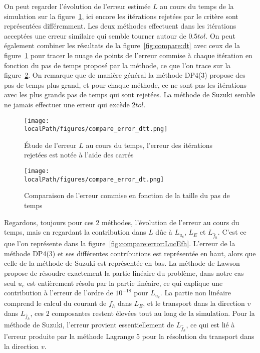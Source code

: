 On peut regarder l'évolution de l'erreur estimée $L$ au cours du temps de la simulation sur la figure~\ref{fig:compare:error_dtt}, ici encore les itérations rejetées par le critère sont représentées différemment. Les deux méthodes effectuent dans les itérations acceptées une erreur similaire qui semble tourner autour de $0.5 tol$. On peut également combiner les résultats de la figure~\ref{fig:compare:dt} avec ceux de la figure~\ref{fig:compare:error_dtt} pour tracer le nuage de points de l'erreur commise à chaque itération en fonction du pas de temps proposé par la méthode, ce que l'on trace sur la figure~\ref{fig:compare:error:dt}. On remarque que de manière général la méthode DP4(3) propose des pas de temps plus grand, et pour chaque méthode, ce ne sont pas les itérations avec les plus grands pas de temps qui sont rejetées. La méthode de Suzuki semble ne jamais effectuer une erreur qui excède $2tol$.

\begin{figure}[h]
  \centering
  \texttt{[image: \\localPath/figures/compare\_error\_dtt.png]}
  \caption{Étude de l'erreur $L$ au cours du temps, l'erreur des itérations rejetées est notée à l'aide des carrés}
  \label{fig:compare:error_dtt}
\end{figure}

\begin{figure}[h]
  \centering
  \texttt{[image: \\localPath/figures/compare\_error\_dt.png]}
  \caption{Comparaison de l'erreur commise en fonction de la taille du pas de temps}
  \label{fig:compare:error:dt}
\end{figure}

Regardons, toujours pour ces 2 méthodes, l'évolution de l'erreur au cours du temps, mais en regardant la contribution dans $L$ d\^ue à $L_{u_c}$, $L_E$ et $L_{\hat{f}_h}$. C'est ce que l'on représente dans la figure~\ref{fig:compare:error:LucEfh}. L'erreur de la méthode DP4(3) et ses différentes contributions est représentée en haut, alors que celle de la méthode de Suzuki est représentée en bas. La méthode de Lawson propose de résoudre exactement la partie linéaire du problème, dans notre cas seul $u_c$ est entièrement résolu par la partie linéaire, ce qui explique une contribution à l'erreur de l'ordre de $10^{-18}$ pour $L_{u_c}$. La partie non linéaire comprend le calcul du courant de $f_h$ dans $L_E$, et le transport dans la direction $v$ dans $L_{\hat{f}_h}$, ces 2 composantes restent élevées tout au long de la simulation. Pour la méthode de Suzuki, l'erreur provient essentiellement de $L_{\hat{f}_h}$, ce qui est  lié à l'erreur produite par la méthode Lagrange 5 pour la résolution du transport dans la direction $v$.

